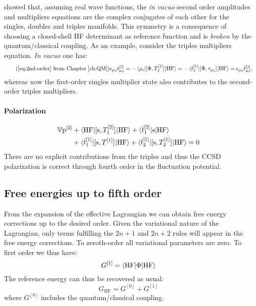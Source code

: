 \citeauthor{Koch1997-nm} showed that, assuming real wave functions, the
\emph{in vacuo} second order amplitudes and multipliers equations are
the complex conjugates of each other for the singles, doubles and
triples manifolds.\autocite{Koch1997-nm, Helgaker2000-tz,
Shavitt2009-mr}
This symmetry is a consequence of choosing a closed-shell \acrshort*{HF}
determinant as reference function\autocite{Shavitt2009-mr} and is
\emph{broken} by the quantum/classical coupling.
As an example, consider the triples multipliers equation. \emph{In vacuo}
one has:
\begin{equation}\tag{\ref{eq:2nd-order} from Chapter \ref{ch:QM}}
  \denom{\mu_3}\tamp{\mu_3}^{[2]}
  = - \braket{\mu_i | \commutator{\Phi}{T_2^{[1]}} | \mathrm{HF}}
  = - \braket{\tbar{2}^{[1]} | \commutator{\Phi}{\cluster{\mu_3}} |
  \mathrm{HF}}
  = \denom{\mu_3}\tbar{\mu_3}^{[2]},
\end{equation}
whereas now the first-order singles multiplier state also contributes to
the second-order triples multipliers.

\paragraph*{Polarization}
\begin{equation}\label{eq:2nd-order-pol}
  \begin{aligned}
  \mathbb{V}\mathrm{p}^{[2]} &+
  \braket{\mathrm{HF} | [ \mathrm{s}, T_1^{[2]} ]^{}| \mathrm{HF}}
  + \braket{\bar{t}_{1}^{[2]} | \mathrm{s} | \mathrm{HF} } \\
  &+ \braket{\bar{t}_{1}^{[1]} | [ \mathrm{s}, T^{[1]} ]^{} | \mathrm{HF}}
  + \braket{\bar{t}_{2}^{[1]} | [ \mathrm{s}, T_2^{[1]} ]^{} | \mathrm{HF}}
  = 0
  \end{aligned}
\end{equation}
There are no explicit contributions from the triples and thus the
\acrshort*{CCSD} polarization is correct through fourth order in the
fluctuation potential.

\subsection{Free energies up to fifth order}\label{sec:energies-pt}

From the expansion of the effective Lagrangian we can obtain free energy
corrections up to the desired order. Given the variational nature of the
Lagrangian, only terms fulfilling the $2n+1$ and $2n+2$ rules will
appear in the free energy corrections.
To zeroth-order all variational parameters are zero. To first order we
thus have:
\begin{equation}\label{eq:pted-mbpt-1st}
  G^{[1]} = \braket{\mathrm{HF} | \Phi | \mathrm{HF}}
\end{equation}
The reference energy can thus be recovered as usual:
\begin{equation}
  G_\mathrm{HF} = G^{[0]} + G^{[1]}
\end{equation}
where $G^{[0]}$ includes the quantum/classical coupling.

